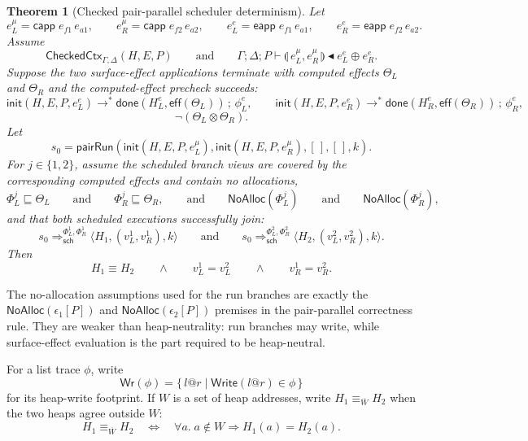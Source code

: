 \documentclass[10pt,a4paper]{article}
\makeatletter
\newcommand{\desc}{\mathrel{\blacktriangleleft}}      %
\newcommand{\approxx}{\mathrel{\sqsubseteq}}          %
\newcommand{\Write}{\mathsf{Write}}
\newcommand{\capp}{\mathsf{capp}\;}
\newcommand{\eapp}{\mathsf{eapp}\;}
\newcommand{\at}{\mathord{@}}
\newcommand{\pparl}{\mathopen{\llparenthesis}}
\newcommand{\pparr}{\mathclose{\rrparenthesis}}
\newcommand{\pairpar}[2]{\pparl\,#1,#2\,\pparr}
\newcommand{\NoAlloc}{\mathsf{NoAlloc}}
\newcommand{\effconflict}{\mathrel{\otimes}}
\newtheorem{theorem}{Theorem}
\makeatother
\begin{document}
\begin{theorem}[Checked pair-parallel scheduler determinism]
Let
\[
e_L^\mu=\capp e_{f1}\,e_{a1},\qquad
e_R^\mu=\capp e_{f2}\,e_{a2},\qquad
e_L^e=\eapp e_{f1}\,e_{a1},\qquad
e_R^e=\eapp e_{f2}\,e_{a2}.
\]
Assume
\[
\mathsf{CheckedCtx}_{\Gamma,\Delta}(H,E,P)
\qquad\text{and}\qquad
\Gamma;\Delta;P\vdash
\pairpar{e_L^\mu}{e_R^\mu}
\desc
e_L^e\oplus e_R^e.
\]
Suppose the two surface-effect applications terminate with computed effects
$\Theta_L$ and $\Theta_R$ and the computed-effect precheck succeeds:
\[
\mathsf{init}(H,E,P,e_L^e)
  \longrightarrow^{*}
  \mathsf{done}(H_L^e,\mathsf{eff}(\Theta_L))\,;\,\phi_L^e,
\qquad
\mathsf{init}(H,E,P,e_R^e)
  \longrightarrow^{*}
  \mathsf{done}(H_R^e,\mathsf{eff}(\Theta_R))\,;\,\phi_R^e,
\]
\[
\neg(\Theta_L\effconflict\Theta_R).
\]
Let
\[
s_0 =
\mathsf{pairRun}(
  \mathsf{init}(H,E,P,e_L^\mu),
  \mathsf{init}(H,E,P,e_R^\mu),
  [\,],[\,],k).
\]
For $j\in\{1,2\}$, assume the scheduled branch views are covered by the
corresponding computed effects and contain no allocations,
\[
\Phi_L^j\approxx\Theta_L
\qquad\text{and}\qquad
\Phi_R^j\approxx\Theta_R,
\qquad\text{and}\qquad
\NoAlloc(\Phi_L^j)
\qquad\text{and}\qquad
\NoAlloc(\Phi_R^j),
\]
and that both scheduled executions successfully join:
\[
s_0
  \Longrightarrow_{\mathsf{sch}}^{\Phi_L^1,\Phi_R^1}
  \langle H_1,(v_L^1,v_R^1),k\rangle
\qquad\text{and}\qquad
s_0
  \Longrightarrow_{\mathsf{sch}}^{\Phi_L^2,\Phi_R^2}
  \langle H_2,(v_L^2,v_R^2),k\rangle.
\]
Then
\[
H_1\equiv H_2
\qquad\land\qquad
v_L^1=v_L^2
\qquad\land\qquad
v_R^1=v_R^2.
\]
\end{theorem}

The no-allocation assumptions used for the run branches are exactly the
$\NoAlloc(\epsilon_1[P])$ and $\NoAlloc(\epsilon_2[P])$ premises in the
pair-parallel correctness rule. They are weaker than heap-neutrality: run
branches may write, while surface-effect evaluation is the part required to be
heap-neutral.

For a list trace $\phi$, write
\[
\mathsf{Wr}(\phi)=
  \{\,l\at r \mid \Write(l\at r)\in\phi\,\}
\]
for its heap-write footprint. If $W$ is a set of heap addresses, write
$H_1\equiv_{\overline W}H_2$ when the two heaps agree outside $W$:
\[
H_1\equiv_{\overline W}H_2
\quad\Longleftrightarrow\quad
\forall a.\; a\notin W \Rightarrow H_1(a)=H_2(a).
\]
\end{document}
